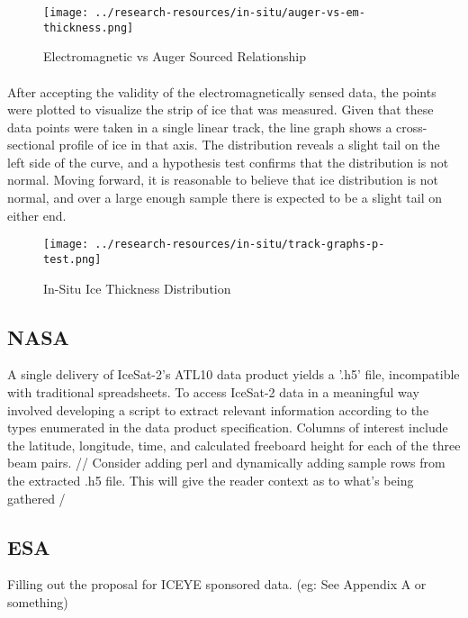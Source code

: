 \begin{figure}[htb]
	\centering
	\texttt{[image: ../research-resources/in-situ/auger-vs-em-thickness.png]}
	\caption{Electromagnetic vs Auger Sourced Relationship}
	\label{fig:aug-vs-em}
\end{figure}

\paragraph*{}
After accepting the validity of the electromagnetically sensed data, the points were plotted to visualize the strip of ice that was measured. Given that these data points were taken in a single linear track, the line graph shows a cross-sectional profile of ice in that axis. The distribution reveals a slight tail on the left side of the curve, and a hypothesis test confirms that the distribution is not normal. Moving forward, it is reasonable to believe that ice distribution is not normal, and over a large enough sample there is expected to be a slight tail on either end.
\par
\begin{figure}[htb]
	\centering
	\texttt{[image: ../research-resources/in-situ/track-graphs-p-test.png]}
	\caption{In-Situ Ice Thickness Distribution}
	\label{fig:p-test-aug}
\end{figure}

\subsection*{NASA}
A single delivery of IceSat-2's ATL10 data product yields a '.h5' file, incompatible with traditional spreadsheets. To access IceSat-2 data in a meaningful way involved developing a script to extract relevant information according to the types enumerated in the data product specification. Columns of interest include the latitude, longitude, time, and calculated freeboard height for each of the three beam pairs.
// Consider adding perl and dynamically adding sample rows from the extracted .h5 file. This will give the reader context as to what's being gathered /


\subsection*{ESA}
Filling out the proposal for ICEYE sponsored data. (eg: See Appendix A or something)